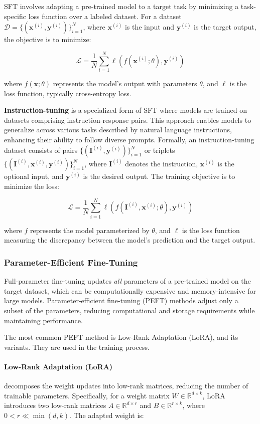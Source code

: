 \documentclass{article}
\newcounter{para}
\begin{document}
SFT involves adapting a pre-trained model to a target task by minimizing a task-specific loss function over a labeled dataset. For a dataset \( \mathcal{D} = \{(\mathbf{x}^{(i)}, \mathbf{y}^{(i)})\}_{i=1}^N \), where \( \mathbf{x}^{(i)} \) is the input and \( \mathbf{y}^{(i)} \) is the target output, the objective is to minimize:

\[
\mathcal{L} = \frac{1}{N} \sum_{i=1}^N \ell(f(\mathbf{x}^{(i)}; \theta), \mathbf{y}^{(i)})
\]

where \( f(\mathbf{x}; \theta) \) represents the model's output with parameters \( \theta \), and \( \ell \) is the loss function, typically cross-entropy loss.

\textbf{Instruction-tuning} is a specialized form of SFT where models are trained on datasets comprising instruction-response pairs. This approach enables models to generalize across various tasks described by natural language instructions, enhancing their ability to follow diverse prompts. Formally, an instruction-tuning dataset consists of pairs \( \{(\mathbf{I}^{(i)}, \mathbf{y}^{(i)})\}_{i=1}^N \) or triplets \( \{(\mathbf{I}^{(i)}, \mathbf{x}^{(i)}, \mathbf{y}^{(i)})\}_{i=1}^N \), where \( \mathbf{I}^{(i)} \) denotes the instruction, \( \mathbf{x}^{(i)} \) is the optional input, and \( \mathbf{y}^{(i)} \) is the desired output. The training objective is to minimize the loss:

\[
\mathcal{L} = \frac{1}{N} \sum_{i=1}^N \ell(f(\mathbf{I}^{(i)}, \mathbf{x}^{(i)}; \theta), \mathbf{y}^{(i)})
\]

where \( f \) represents the model parameterized by \( \theta \), and \( \ell \) is the loss function measuring the discrepancy between the model's prediction and the target output.

\subsubsection{Parameter-Efficient Fine-Tuning} \label{sec:peft}
Full-parameter fine-tuning updates \textit{all} parameters of a pre-trained model on the target dataset, which can be computationally expensive and memory-intensive for large models. Parameter-efficient fine-tuning (PEFT) methods adjust only a subset of the parameters, reducing computational and storage requirements while maintaining performance.

The most common PEFT method is Low-Rank Adaptation (LoRA), and its variants. They are used in the training process.

\paragraph{Low-Rank Adaptation (LoRA)} decomposes the weight updates into low-rank matrices, reducing the number of trainable parameters. Specifically, for a weight matrix \( W \in \mathbb{R}^{d \times k} \), LoRA introduces two low-rank matrices \( A \in \mathbb{R}^{d \times r} \) and \( B \in \mathbb{R}^{r \times k} \), where \( 0 < r \ll \min(d, k) \). The adapted weight is:
\end{document}
